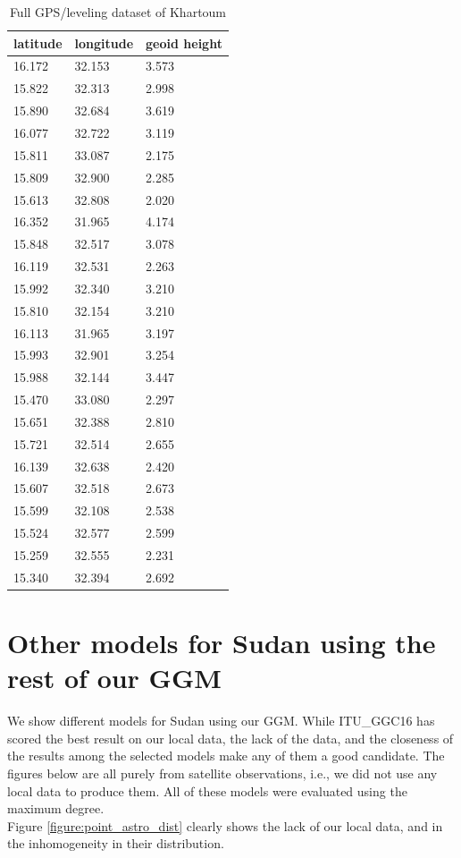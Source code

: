 \begin{table}[]
	\centering
	\caption{Full GPS/leveling dataset of Khartoum \citep{ahmed_msc}}
	\label{table:khartoum_gps_leveling_data}
	\begin{tabular}{@{}lll@{}}
		\toprule
		latitude & longitude & geoid height \\ \midrule
		16.172   & 32.153    & 3.573        \\
		15.822   & 32.313    & 2.998        \\
		15.890   & 32.684    & 3.619        \\
		16.077   & 32.722    & 3.119        \\
		15.811   & 33.087    & 2.175        \\
		15.809   & 32.900    & 2.285        \\
		15.613   & 32.808    & 2.020        \\
		16.352   & 31.965    & 4.174        \\
		15.848   & 32.517    & 3.078        \\
		16.119   & 32.531    & 2.263        \\
		15.992   & 32.340    & 3.210        \\
		15.810   & 32.154    & 3.210        \\
		16.113   & 31.965    & 3.197        \\
		15.993   & 32.901    & 3.254        \\
		15.988   & 32.144    & 3.447        \\
		15.470   & 33.080    & 2.297        \\
		15.651   & 32.388    & 2.810        \\
		15.721   & 32.514    & 2.655        \\
		16.139   & 32.638    & 2.420        \\
		15.607   & 32.518    & 2.673        \\
		15.599   & 32.108    & 2.538        \\
		15.524   & 32.577    & 2.599        \\
		15.259   & 32.555    & 2.231        \\
		15.340   & 32.394    & 2.692        \\ \bottomrule
	\end{tabular}
\end{table}

\section{Other models for Sudan using the rest of our GGM}
We show different models for Sudan using our GGM. While ITU\_GGC16 has scored the best result on our local data, the lack of the data, and the closeness of the results among the selected models make any of them a good candidate. The figures below are all purely from satellite observations, i.e., we did not use any local data to produce them. All of these models were evaluated using the maximum degree.
\\  
Figure \ref{figure:point_astro_dist} clearly shows the lack of our local data, and in the inhomogeneity in their distribution.

